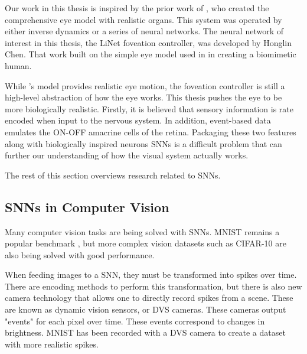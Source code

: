 \documentclass[../taasin.tex]{subfiles}
\begin{document}

Our work in this thesis is inspired by the prior work of \cite{Arjun}, who created the comprehensive eye model with realistic organs. This system was operated by either inverse dynamics or a series of neural networks. The neural network of interest in this thesis, the LiNet foveation controller, was developed by Honglin Chen. That work built on the simple eye model used in \cite{Masaki} in creating a biomimetic human.

While \cite{Arjun}'s model provides realistic eye motion, the foveation controller is still a high-level abstraction of how the eye works. This thesis pushes the eye to be more biologically realistic. Firstly, it is believed that sensory information is rate encoded when input to the nervous system. In addition, event-based data emulates the ON-OFF amacrine cells of the retina. Packaging these two features along with biologically inspired neurons SNNs is a difficult problem that can further our understanding of how the visual system actually works.

The rest of this section overviews research related to SNNs.


\subsection{SNNs in Computer Vision}

Many computer vision tasks are being solved with SNNs. MNIST remains a popular benchmark \cite{10.3389/fncom.2015.00099}, but more complex vision datasets such as CIFAR-10 are also being solved \cite{10.3389/fnins.2019.00095} with good performance. 



When feeding images to a SNN, they must be transformed into spikes over time. There are encoding methods to perform this transformation, but there is also new camera technology that allows one to directly record spikes from a scene. These are known as dynamic vision sensors, or DVS cameras. These cameras output "events" for each pixel over time. These events correspond to changes in brightness. MNIST has been recorded with a DVS camera to create a dataset with more realistic spikes. \cite{event_vision_survey}
\end{document}

